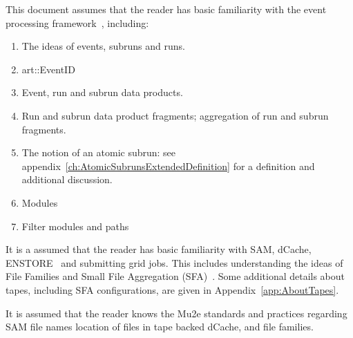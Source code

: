 This document assumes that the reader has basic familiarity with the \art event processing framework~\cite{ARTWORDPRESS}, including:

\begin{enumerate}
\item The ideas of events, subruns and runs.
\item {\code art::EventID}
\item Event, run and subrun  data products.
\item Run and subrun data product fragments; aggregation of run and subrun fragments.
\item The notion of an atomic subrun: see appendix~\ref{ch:AtomicSubrunsExtendedDefinition} for a definition and additional discussion.
\item Modules
\item Filter modules and paths
\end{enumerate}

It is a assumed that the reader has basic familiarity with SAM, dCache, ENSTORE~\cite{ENSTORE} and submitting grid jobs.
This includes understanding the ideas of File Families and Small File Aggregation (SFA)~\cite{SFA}.
Some additional details about tapes, including SFA configurations, are given in Appendix~\ref{app:AboutTapes}.

It is assumed that the reader knows the Mu2e standards and practices regarding SAM file names\cite{Mu2eSAM}
location of files in tape backed dCache\cite{FileNames}, and file families.
